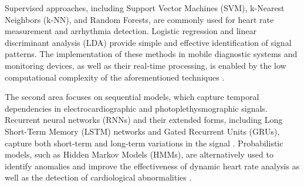 \documentclass{citask}
\begin{document}
Supervised approaches, including Support Vector Machines (SVM), k-Nearest Neighbors (k-NN), and Random Forests, are commonly used for heart rate measurement and arrhythmia detection. Logistic regression and linear discriminant analysis (LDA) provide simple and effective identification of signal patterns. The implementation of these methods in mobile diagnostic systems and monitoring devices, as well as their real-time processing, is enabled by the low computational complexity of the aforementioned techniques \cite{11}.

The second area focuses on sequential models, which capture temporal dependencies in electrocardiographic and photoplethysmographic signals. Recurrent neural networks (RNNs) and their extended forms, including Long Short-Term Memory (LSTM) networks and Gated Recurrent Units (GRUs), capture both short-term and long-term variations in the signal \cite{12}. Probabilistic models, such as Hidden Markov Models (HMMs), are alternatively used to identify anomalies and improve the effectiveness of dynamic heart rate analysis as well as the detection of cardiological abnormalities \cite{13}.
\end{document}
